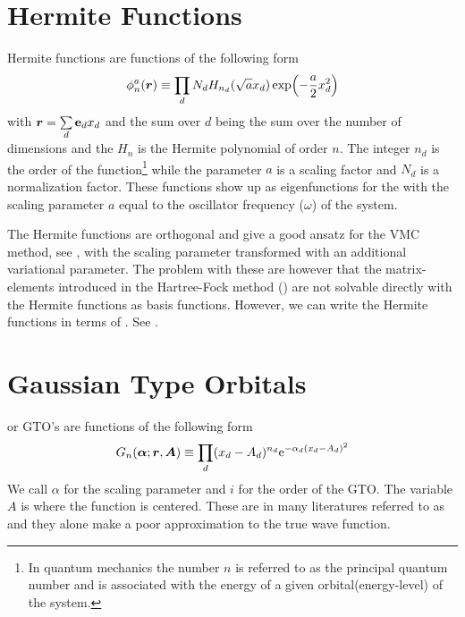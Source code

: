 \section{Hermite Functions}
    Hermite functions are functions of the following form
        \begin{equation}
            \phi^a_n(\boldsymbol{{r}}) \equiv \prod_d N_d
            H_{n_d}(\sqrt{a}x_d)\exp(-\frac{a}{2}x^2_d)
            \label{eq:HermiteFunc}
        \end{equation}
    with $\boldsymbol{{r}} = \sum\limits_d \boldsymbol{{\mathrm{e}}}_dx_d$ and the sum over $d$ being
    the sum over the number of dimensions and the $H_n$ is the Hermite
    polynomial of order $n$. The integer $n_d$ is the order of the
    function\footnote{In quantum mechanics the number $n$ is referred to as the
    principal quantum number and is associated with the energy of a given
    orbital(energy-level) of the system.} while the parameter $a$ is a scaling
    factor and $N_d$ is a normalization factor. These functions show up as
    eigenfunctions for the \cite{GriffQuan} with the scaling parameter $a$ equal to the
    oscillator frequency ($\omega$) of the system.

    The Hermite functions are orthogonal and give a good ansatz for the VMC
    method, see , with the scaling parameter transformed with an
    additional variational parameter. The problem with these are however that
    the matrix-elements introduced in the Hartree-Fock method
    () are not solvable directly with the Hermite functions
    as basis functions. However, we can write the Hermite functions in terms of
    . See .

\section{Gaussian Type Orbitals}
     or GTO's are functions of the following
    form\cite{HelgakerMolElcTheory}
        \begin{equation}
            G_n(\boldsymbol{{\alpha}};\boldsymbol{{r}},\boldsymbol{{A}}) \equiv \prod_d (x_d-A_d)^{n_d}
            \mathrm{e}^{-\alpha_d (x_d-A_d)^2}
            \label{eq:GTOdef1d}
        \end{equation}
    We call $\alpha$ for the scaling parameter and $i$ for the order of the
    GTO. The variable $A$ is where the function is centered. These are in many
    literatures referred to as  and they alone
    make a poor approximation to the true wave function.


